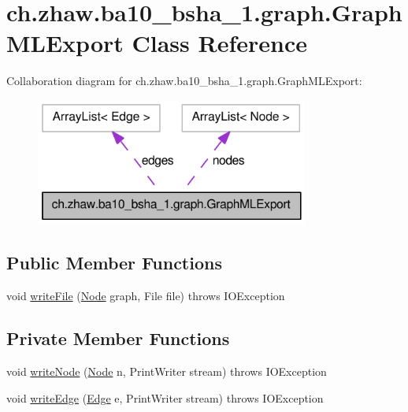 \hypertarget{classch_1_1zhaw_1_1ba10__bsha__1_1_1graph_1_1GraphMLExport}{
\section{ch.zhaw.ba10\_\-bsha\_\-1.graph.GraphMLExport Class Reference}
\label{classch_1_1zhaw_1_1ba10__bsha__1_1_1graph_1_1GraphMLExport}
}
Collaboration diagram for ch.zhaw.ba10\_\-bsha\_\-1.graph.GraphMLExport:\nopagebreak
\begin{figure}[H]
\begin{center}
\leavevmode
\includegraphics[width=254pt]{classch_1_1zhaw_1_1ba10__bsha__1_1_1graph_1_1GraphMLExport__coll__graph}
\end{center}
\end{figure}
\subsection*{Public Member Functions}
\begin{DoxyCompactItemize}
\item 
void \hyperlink{classch_1_1zhaw_1_1ba10__bsha__1_1_1graph_1_1GraphMLExport_a5ca63fefbff43c1591da29d3529144cb}{writeFile} (\hyperlink{classch_1_1zhaw_1_1ba10__bsha__1_1_1graph_1_1Node}{Node} graph, File file)  throws IOException 
\end{DoxyCompactItemize}
\subsection*{Private Member Functions}
\begin{DoxyCompactItemize}
\item 
void \hyperlink{classch_1_1zhaw_1_1ba10__bsha__1_1_1graph_1_1GraphMLExport_a5a853fe3b7dd0a477a6805b74768bb5e}{writeNode} (\hyperlink{classch_1_1zhaw_1_1ba10__bsha__1_1_1graph_1_1Node}{Node} n, PrintWriter stream)  throws IOException 
\item 
void \hyperlink{classch_1_1zhaw_1_1ba10__bsha__1_1_1graph_1_1GraphMLExport_aafa9816a624b6f1f332dae553c543f39}{writeEdge} (\hyperlink{classch_1_1zhaw_1_1ba10__bsha__1_1_1graph_1_1Edge}{Edge} e, PrintWriter stream)  throws IOException 
\end{DoxyCompactItemize}
